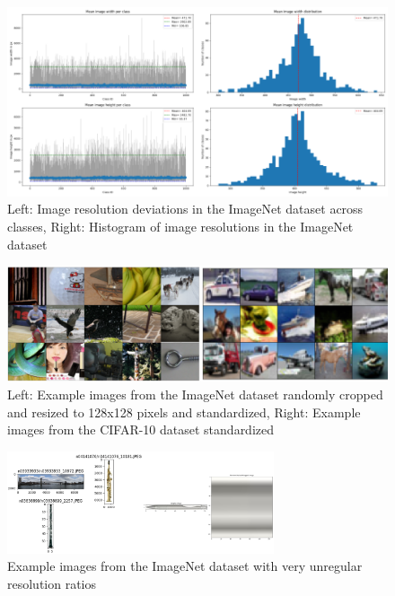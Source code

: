\begin{figure}[H]
    \centering
    \includegraphics[width=\textwidth]{images/imagenet_histo_errorbars}
    \caption{Left: Image resolution deviations in the ImageNet dataset across classes,
        Right: Histogram of image resolutions in the ImageNet dataset}
    \label{fig:bigboy}
\end{figure}

\begin{figure}[H]
    \centering
    \includegraphics[width=\textwidth]{images/normalized_images_cifar_imagenet}
    \caption{Left: Example images from the ImageNet dataset randomly cropped and resized to 128x128 pixels and standardized, Right: Example images from the CIFAR-10 dataset standardized}
    \label{fig:cifar_imagenet_normalized}
\end{figure}

\begin{figure}[H]
    \centering
    \includegraphics[width=0.7\textwidth]{images/extreme_shapes}
    \caption{Example images from the ImageNet dataset with very unregular resolution ratios}
    \label{fig:optimum_resolution}
\end{figure}